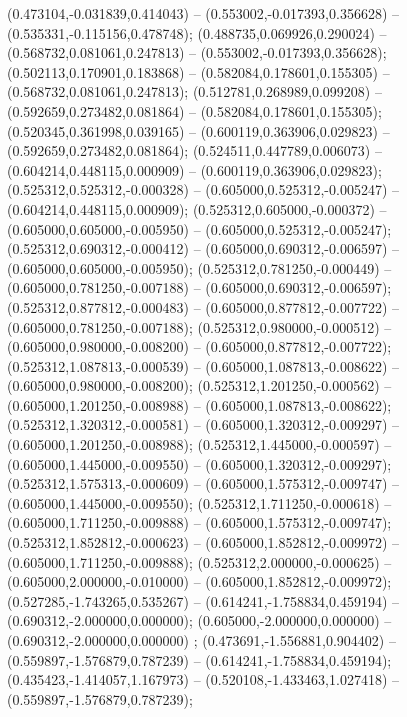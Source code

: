  (0.473104,-0.031839,0.414043) -- (0.553002,-0.017393,0.356628) -- (0.535331,-0.115156,0.478748);
 (0.488735,0.069926,0.290024) -- (0.568732,0.081061,0.247813) -- (0.553002,-0.017393,0.356628);
 (0.502113,0.170901,0.183868) -- (0.582084,0.178601,0.155305) -- (0.568732,0.081061,0.247813);
 (0.512781,0.268989,0.099208) -- (0.592659,0.273482,0.081864) -- (0.582084,0.178601,0.155305);
 (0.520345,0.361998,0.039165) -- (0.600119,0.363906,0.029823) -- (0.592659,0.273482,0.081864);
 (0.524511,0.447789,0.006073) -- (0.604214,0.448115,0.000909) -- (0.600119,0.363906,0.029823);
 (0.525312,0.525312,-0.000328) -- (0.605000,0.525312,-0.005247) -- (0.604214,0.448115,0.000909);
 (0.525312,0.605000,-0.000372) -- (0.605000,0.605000,-0.005950) -- (0.605000,0.525312,-0.005247);
 (0.525312,0.690312,-0.000412) -- (0.605000,0.690312,-0.006597) -- (0.605000,0.605000,-0.005950);
 (0.525312,0.781250,-0.000449) -- (0.605000,0.781250,-0.007188) -- (0.605000,0.690312,-0.006597);
 (0.525312,0.877812,-0.000483) -- (0.605000,0.877812,-0.007722) -- (0.605000,0.781250,-0.007188);
 (0.525312,0.980000,-0.000512) -- (0.605000,0.980000,-0.008200) -- (0.605000,0.877812,-0.007722);
 (0.525312,1.087813,-0.000539) -- (0.605000,1.087813,-0.008622) -- (0.605000,0.980000,-0.008200);
 (0.525312,1.201250,-0.000562) -- (0.605000,1.201250,-0.008988) -- (0.605000,1.087813,-0.008622);
 (0.525312,1.320312,-0.000581) -- (0.605000,1.320312,-0.009297) -- (0.605000,1.201250,-0.008988);
 (0.525312,1.445000,-0.000597) -- (0.605000,1.445000,-0.009550) -- (0.605000,1.320312,-0.009297);
 (0.525312,1.575313,-0.000609) -- (0.605000,1.575312,-0.009747) -- (0.605000,1.445000,-0.009550);
 (0.525312,1.711250,-0.000618) -- (0.605000,1.711250,-0.009888) -- (0.605000,1.575312,-0.009747);
 (0.525312,1.852812,-0.000623) -- (0.605000,1.852812,-0.009972) -- (0.605000,1.711250,-0.009888);
 (0.525312,2.000000,-0.000625) -- (0.605000,2.000000,-0.010000) -- (0.605000,1.852812,-0.009972);
 (0.527285,-1.743265,0.535267) -- (0.614241,-1.758834,0.459194) -- (0.690312,-2.000000,0.000000);
 (0.605000,-2.000000,0.000000) -- (0.690312,-2.000000,0.000000) ;
 (0.473691,-1.556881,0.904402) -- (0.559897,-1.576879,0.787239) -- (0.614241,-1.758834,0.459194);
 (0.435423,-1.414057,1.167973) -- (0.520108,-1.433463,1.027418) -- (0.559897,-1.576879,0.787239);
